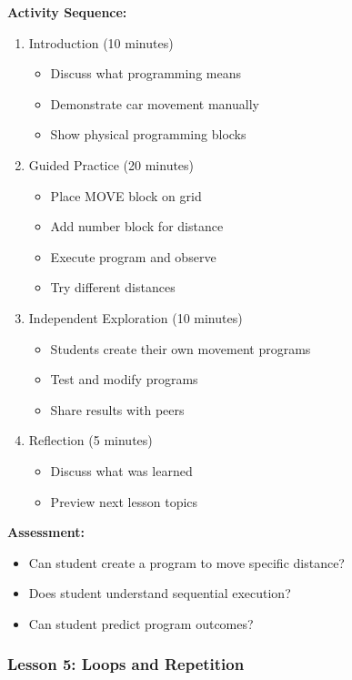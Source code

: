 \textbf{Activity Sequence:}
\begin{enumerate}
    \item Introduction (10 minutes)
    \begin{itemize}
        \item Discuss what programming means
        \item Demonstrate car movement manually
        \item Show physical programming blocks
    \end{itemize}
    
    \item Guided Practice (20 minutes)
    \begin{itemize}
        \item Place MOVE block on grid
        \item Add number block for distance
        \item Execute program and observe
        \item Try different distances
    \end{itemize}
    
    \item Independent Exploration (10 minutes)
    \begin{itemize}
        \item Students create their own movement programs
        \item Test and modify programs
        \item Share results with peers
    \end{itemize}
    
    \item Reflection (5 minutes)
    \begin{itemize}
        \item Discuss what was learned
        \item Preview next lesson topics
    \end{itemize}
\end{enumerate}

\textbf{Assessment:}
\begin{itemize}
    \item Can student create a program to move specific distance?
    \item Does student understand sequential execution?
    \item Can student predict program outcomes?
\end{itemize}

\subsubsection{Lesson 5: Loops and Repetition}

